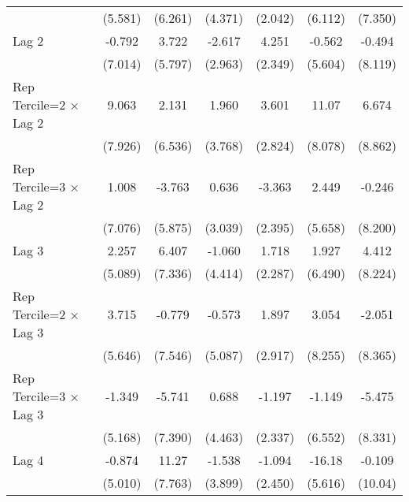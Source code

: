 \begin{table}[htbp]
\begin{tabular}{l*{6}{c}}
                &  (5.581)         &  (6.261)         &  (4.371)         &  (2.042)         &  (6.112)         &  (7.350)         \\
\addlinespace
Lag 2           &   -0.792         &    3.722         &   -2.617         &    4.251         &   -0.562         &   -0.494         \\
                &  (7.014)         &  (5.797)         &  (2.963)         &  (2.349)         &  (5.604)         &  (8.119)         \\
\addlinespace
Rep Tercile=2 $\times$ Lag 2&    9.063         &    2.131         &    1.960         &    3.601         &    11.07         &    6.674         \\
                &  (7.926)         &  (6.536)         &  (3.768)         &  (2.824)         &  (8.078)         &  (8.862)         \\
\addlinespace
Rep Tercile=3 $\times$ Lag 2&    1.008         &   -3.763         &    0.636         &   -3.363         &    2.449         &   -0.246         \\
                &  (7.076)         &  (5.875)         &  (3.039)         &  (2.395)         &  (5.658)         &  (8.200)         \\
\addlinespace
Lag 3           &    2.257         &    6.407         &   -1.060         &    1.718         &    1.927         &    4.412         \\
                &  (5.089)         &  (7.336)         &  (4.414)         &  (2.287)         &  (6.490)         &  (8.224)         \\
\addlinespace
Rep Tercile=2 $\times$ Lag 3&    3.715         &   -0.779         &   -0.573         &    1.897         &    3.054         &   -2.051         \\
                &  (5.646)         &  (7.546)         &  (5.087)         &  (2.917)         &  (8.255)         &  (8.365)         \\
\addlinespace
Rep Tercile=3 $\times$ Lag 3&   -1.349         &   -5.741         &    0.688         &   -1.197         &   -1.149         &   -5.475         \\
                &  (5.168)         &  (7.390)         &  (4.463)         &  (2.337)         &  (6.552)         &  (8.331)         \\
\addlinespace
Lag 4           &   -0.874         &    11.27         &   -1.538         &   -1.094         &   -16.18\sym{**} &   -0.109         \\
                &  (5.010)         &  (7.763)         &  (3.899)         &  (2.450)         &  (5.616)         &  (10.04)         \\

\end{tabular}
\end{table}
